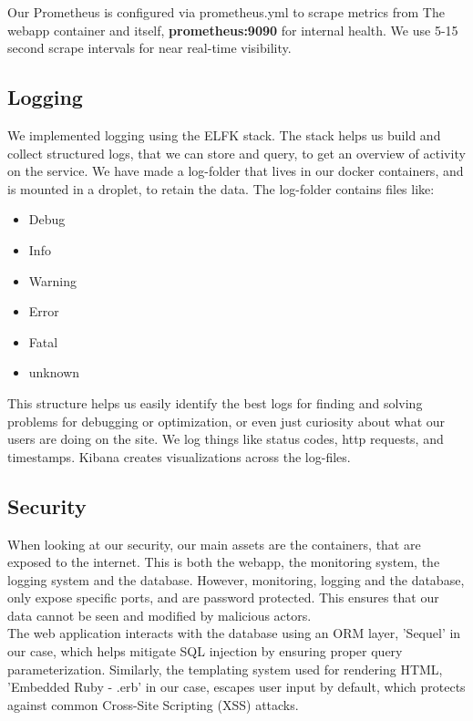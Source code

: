 Our Prometheus is configured via prometheus.yml to scrape metrics from The webapp container and itself, \textbf{prometheus:9090} for internal health. We use 5-15 second scrape intervals for near real-time visibility.


\subsection{Logging}

We implemented logging using the ELFK stack. The stack helps us build and collect structured logs, that we can store and query, to get an overview of activity on the service. We have made a log-folder that lives in our docker containers, and is mounted in a droplet, to retain the data. The log-folder contains files like:

\begin{itemize}
    \item Debug
    \item Info
    \item Warning
    \item Error
    \item Fatal
    \item unknown
\end{itemize}

This structure helps us easily identify the best logs for finding and solving problems for debugging or optimization, or even just curiosity about what our users are doing on the site. We log things like status codes, http requests, and timestamps. Kibana creates visualizations across the log-files. \\


\subsection{Security}
When looking at our security, our main assets are the containers, that are exposed to the internet. This is both the webapp, the monitoring system, the logging system and the database. However, monitoring, logging and the database, only expose specific ports, and are password protected. This ensures that our data cannot be seen and modified by malicious actors.\\

The web application interacts with the database using an ORM layer, 'Sequel' in our case, which helps mitigate SQL injection by ensuring proper query parameterization. Similarly, the templating system used for rendering HTML, 'Embedded Ruby - .erb' in our case, escapes user input by default, which protects against common Cross-Site Scripting (XSS) attacks. \\

